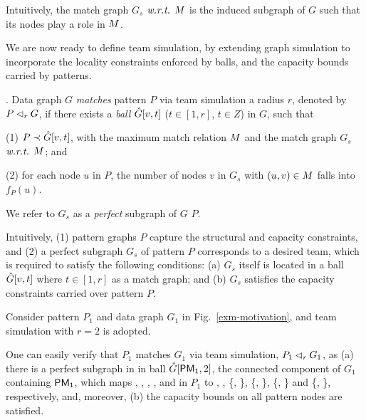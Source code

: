 Intuitively, the match graph $G_s$ $\emph{w.r.t.}$ $M$ is the induced subgraph of
$G$ such that its nodes play a role in $M$.



We are now ready to define team simulation, by extending graph simulation to incorporate the locality constraints enforced by balls, and the capacity bounds carried by patterns.

. Data graph $G$ {\em matches} pattern $P$  via
team simulation \wrt a radius $r$, denoted by $P \lhd_r G$, if
there exists a {\em ball} $\hat{G}{[v, t]}$ ($t \in [1,r]$, $t \in Z$) in $G$, such that

\vspace{0.5ex}
\ni(1) $P\prec \hat{G}{[v, t]}$, with the maximum match relation $M$ and the match graph $G_s$ $\emph{w.r.t.}$ $M$; and

\vspace{0.5ex}
\ni(2) for each node $u$ in $P$, the number of nodes $v$ in $G_s$  with $(u, v)\in M$ falls into $f_P(u)$.

\vspace{0.5ex}
We refer to  $G_s$ as a {\em perfect} subgraph of $G$ \wrt $P$.


Intuitively, (1) pattern graphs $P$ capture the structural and capacity constraints, and (2) a perfect subgraph $G_s$ of pattern $P$ corresponds to a desired team, which is required to satisfy the following conditions:
(a) $G_s$ itself is located in a ball $\hat{G}{[v, t]}$  where $t \in [1,r]$ as a match graph; and
(b) $G_s$ satisfies the capacity constraints carried over pattern $P$.



\begin{example}
\label{exm-rsimulation}
Consider pattern $P_1$ and data graph $G_1$ in Fig.~\ref{exm-motivation}, and  team simulation with $r=2$ is adopted.

One can easily verify that $P_1$ matches $G_1$  via team simulation, \ie $P_1 \lhd_r G_1$,
as (a) there is a perfect subgraph in in ball
$\hat{G}{[{\mathsf{PM_1}}, 2]}$, \ie the connected component of $G_1$ containing ${\mathsf{PM_{1}}}$, which maps , , , ,  and  in $P_1$ to , , \{, \}, \{, \}, \{, \} and \{, \}, respectively, and, moreover, (b) the capacity bounds on all pattern nodes are satisfied.
\end{example}

